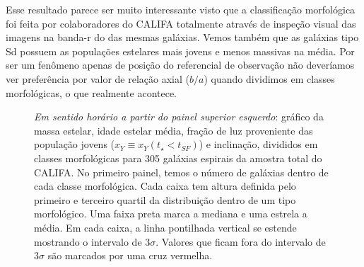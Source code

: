 Esse resultado parece ser muito interessante visto que a classificação morfológica foi feita por
colaboradores do CALIFA totalmente através de inspeção visual das imagens na banda-r do \SDSS das
mesmas galáxias. Vemos também que as galáxias tipo Sd possuem as populações estelares mais jovens e
menos massivas na média. Por ser um fenômeno apenas de posição do referencial de observação não
deveríamos ver preferência por valor de relação axial ($b/a$) quando dividimos em classes
morfológicas, o que realmente acontece.

\begin{figure}
	\centering
	\caption[Classificação por morfologia.]
	{\emph{Em sentido horário a partir do painel superior esquerdo}: gráfico da massa estelar, idade
	estelar média, fração de luz proveniente das população jovens ($x_Y \equiv x_Y(t_\star < t_{SF})$) e
	inclinação, divididos em classes morfológicas para 305 galáxias espirais da amostra total do
	CALIFA. No primeiro painel, temos o número de galáxias dentro de cada classe morfológica. Cada
	caixa tem altura definida pelo primeiro e terceiro quartil da distribuição dentro de um tipo
	morfológico. Uma faixa preta marca a mediana e uma estrela a média. Em cada caixa, a linha
	pontilhada vertical se estende mostrando o intervalo de $3\sigma$. Valores que ficam fora do
	intervalo de $3\sigma$ são marcados por uma cruz vermelha.}
	\label{fig:amostraMorf}
\end{figure}

